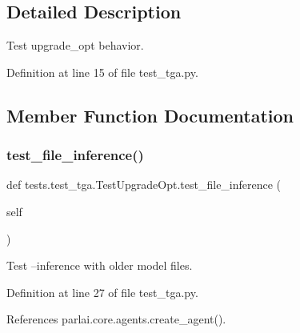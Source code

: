 \subsection{Detailed Description}
\begin{DoxyVerb}Test upgrade_opt behavior.\end{DoxyVerb}
 

Definition at line 15 of file test\+\_\+tga.\+py.



\subsection{Member Function Documentation}
\mbox{\label{classtests_1_1test__tga_1_1TestUpgradeOpt_a8ba19a5f6b229d7f34a3a8ac022e211b}} 
\subsubsection{\texorpdfstring{test\+\_\+file\+\_\+inference()}{test\_file\_inference()}}
{\footnotesize\ttfamily def tests.\+test\+\_\+tga.\+Test\+Upgrade\+Opt.\+test\+\_\+file\+\_\+inference (\begin{DoxyParamCaption}\item[{}]{self }\end{DoxyParamCaption})}

\begin{DoxyVerb}Test --inference with older model files.\end{DoxyVerb}
 

Definition at line 27 of file test\+\_\+tga.\+py.



References parlai.\+core.\+agents.\+create\+\_\+agent().

